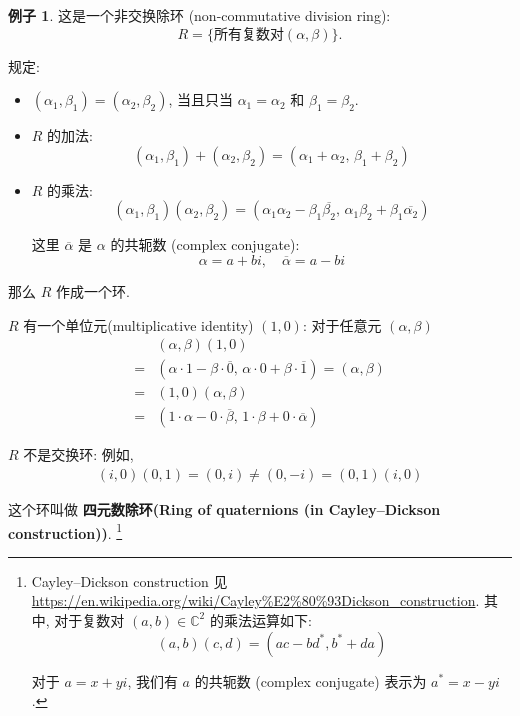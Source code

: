 \documentclass[utf8]{ctexbook}
\theoremstyle{definition}
\newtheorem{example}{例子}[section]
\begin{document}
\begin{example}\label{example_ring_quaternions}
这是一个非交换除环 (non-commutative division ring):
\begin{equation}
R = \{ \mbox{所有复数对} (\alpha, \beta) \} .
\end{equation}

规定:
\begin{itemize}
\item{$(\alpha_1, \beta_1 ) = (\alpha_2, \beta_2 )$, 当且只当 $ \alpha_1 = \alpha_2$ 和 $\beta_1 = \beta_2 $.}
\item{$R$ 的加法:
\begin{equation}
(\alpha_1, \beta_1) + (\alpha_2, \beta_2) = (\alpha_1 + \alpha_2,\, \beta_1 + \beta_2)
\end{equation}
}
\item{$R$ 的乘法:
\begin{equation}
(\alpha_1, \beta_1) (\alpha_2, \beta_2) = ( \alpha_1 \alpha_2 - \beta_1 \overline{\beta_2},\, \alpha_1 \beta_2 + \beta_1 \overline{\alpha_2} )
\end{equation}

这里 $\overline{\alpha}$ 是 $\alpha$ 的共轭数 (complex conjugate):
\begin{equation}
\alpha = a + b i , \quad \overline{\alpha} = a - b i
\end{equation}
}
\end{itemize}

那么 $R$ 作成一个环. 

$R$ 有一个单位元(multiplicative identity) $(1, 0)$: 对于任意元 $(\alpha, \beta)$
\begin{align*}
& (\alpha, \beta) (1, 0) \\
= & ( \alpha \cdot 1 - \beta \cdot \overline{0},\, \alpha \cdot 0 + \beta \cdot \overline{1} ) = (\alpha, \beta) \\
= & (1, 0)  (\alpha, \beta) \\
= & ( 1 \cdot \alpha - 0 \cdot \overline{\beta},\, 1 \cdot \beta + 0 \cdot \overline{\alpha} )
\end{align*}

$R$ 不是交换环: 例如,
\begin{align*}
(i, 0) (0, 1) = (0, i) \neq (0, -i) = (0, 1) (i, 0)
\end{align*}

这个环叫做 \textbf{四元数除环(Ring of quaternions (in Cayley–Dickson construction))}. \footnote{Cayley–Dickson construction 见 \url{https://en.wikipedia.org/wiki/Cayley\%E2\%80\%93Dickson\_construction}. 其中, 对于复数对 $(a, b) \in \mathbb{C}^2$ 的乘法运算如下:
\begin{equation}
(a,b)(c,d) = (ac - bd^*, b^* + da)
\end{equation}

对于 $a= x + y i$, 我们有 $a$ 的共轭数 (complex conjugate) 表示为 $a^* = x - yi$.
}
\end{example}
\end{document}
